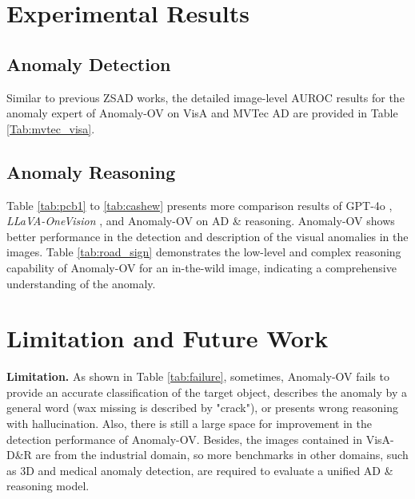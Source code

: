 \section{Experimental Results}

\subsection{Anomaly Detection}

Similar to previous ZSAD works, the detailed image-level AUROC results for the anomaly expert of Anomaly-OV on VisA \cite{visa} and MVTec AD \cite{mvtec} are provided in Table \ref{Tab:mvtec_visa}.

\subsection{Anomaly Reasoning}






Table \ref{tab:pcb1} to \ref{tab:cashew} presents more comparison results of GPT-4o \cite{gpt-api-4o}, \textit{LLaVA-OneVision} \cite{llavaonevision}, and Anomaly-OV on AD \& reasoning. Anomaly-OV shows better performance in the detection and description of the visual anomalies in the images. Table \ref{tab:road_sign} demonstrates the low-level and complex reasoning capability of Anomaly-OV for an in-the-wild image, indicating a comprehensive understanding of the anomaly.


\section{Limitation and Future Work}

\noindent
\textbf{Limitation.} As shown in Table \ref{tab:failure}, sometimes, Anomaly-OV fails to provide an accurate classification of the target object, describes the anomaly by a general word (wax missing is described by "crack"), or presents wrong reasoning with hallucination. Also, there is still a large space for improvement in the detection performance of Anomaly-OV. Besides, the images contained in VisA-D\&R  are from the industrial domain, so more benchmarks in other domains, such as 3D and medical anomaly detection, are required to evaluate a unified AD \& reasoning model.

\medskip

